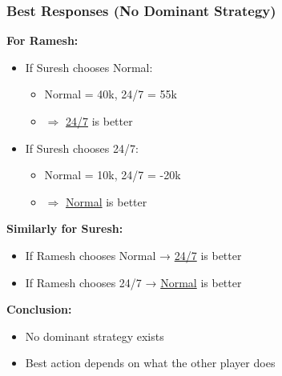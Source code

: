 \begin{frame}[fragile]\frametitle{Best Responses (No Dominant Strategy)}

\textbf{For Ramesh:}

\begin{itemize}
  \item If Suresh chooses Normal:
  \begin{itemize}
    \item Normal = 40k, 24/7 = 55k
    \item $\Rightarrow$ \underline{24/7} is better
  \end{itemize}
  
  \item If Suresh chooses 24/7:
  \begin{itemize}
    \item Normal = 10k, 24/7 = -20k
    \item $\Rightarrow$ \underline{Normal} is better
  \end{itemize}
\end{itemize}

\vspace{6pt}

\textbf{Similarly for Suresh:}

\begin{itemize}
  \item If Ramesh chooses Normal → \underline{24/7} is better
  \item If Ramesh chooses 24/7 → \underline{Normal} is better
\end{itemize}

\vspace{8pt}

\textbf{Conclusion:}
\begin{itemize}
  \item No dominant strategy exists
  \item Best action depends on what the other player does
\end{itemize}

\end{frame}

